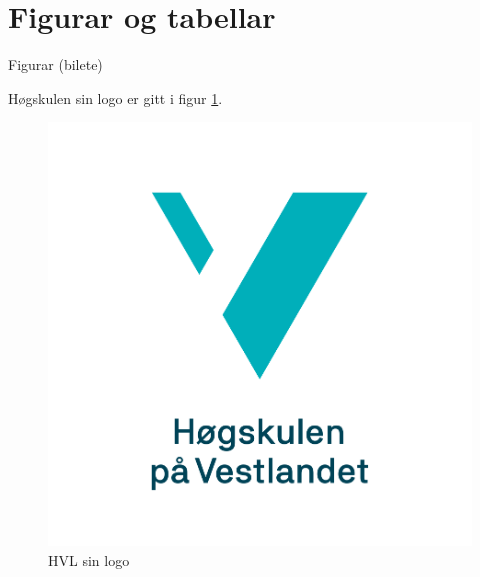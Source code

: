 \section{Figurar og tabellar}

	\begin{frame}{Figurar (bilete)}
	
	Høgskulen sin logo er gitt i figur \ref{fig:hvl-logo}.
	
	\begin{figure}
		\includegraphics[scale=0.1]{img/HVL-logo-vert-pos-norsk.png}
		\caption{HVL sin logo}
		\label{fig:hvl-logo}
	\end{figure}
	
\end{frame}


